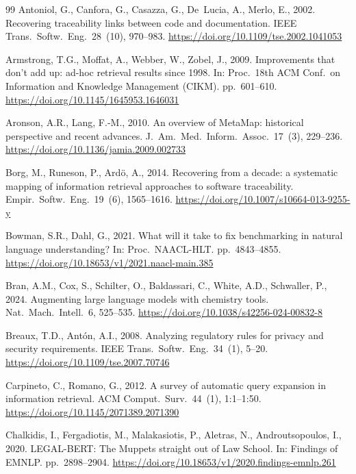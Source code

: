 \documentclass[a4paper,fleqn]{cas-sc}
\begin{document}
\begin{thebibliography}{99}
Antoniol, G., Canfora, G., Casazza, G., De~Lucia, A., Merlo, E., 2002. Recovering traceability links between code and documentation. IEEE Trans.\ Softw.\ Eng.\ 28~(10), 970--983. \url{https://doi.org/10.1109/tse.2002.1041053}

Armstrong, T.G., Moffat, A., Webber, W., Zobel, J., 2009. Improvements that don't add up: ad-hoc retrieval results since 1998. In: Proc.\ 18th ACM Conf.\ on Information and Knowledge Management (CIKM). pp.\ 601--610. \url{https://doi.org/10.1145/1645953.1646031}

Aronson, A.R., Lang, F.-M., 2010. An overview of MetaMap: historical perspective and recent advances. J.\ Am.\ Med.\ Inform.\ Assoc.\ 17~(3), 229--236. \url{https://doi.org/10.1136/jamia.2009.002733}

Borg, M., Runeson, P., Ard\"o, A., 2014. Recovering from a decade: a systematic mapping of information retrieval approaches to software traceability. Empir.\ Softw.\ Eng.\ 19~(6), 1565--1616. \url{https://doi.org/10.1007/s10664-013-9255-y}

Bowman, S.R., Dahl, G., 2021. What will it take to fix benchmarking in natural language understanding? In: Proc.\ NAACL-HLT. pp.\ 4843--4855. \url{https://doi.org/10.18653/v1/2021.naacl-main.385}

Bran, A.M., Cox, S., Schilter, O., Baldassari, C., White, A.D., Schwaller, P., 2024. Augmenting large language models with chemistry tools. Nat.\ Mach.\ Intell.\ 6, 525--535. \url{https://doi.org/10.1038/s42256-024-00832-8}

Breaux, T.D., Ant\'on, A.I., 2008. Analyzing regulatory rules for privacy and security requirements. IEEE Trans.\ Softw.\ Eng.\ 34~(1), 5--20. \url{https://doi.org/10.1109/tse.2007.70746}

Carpineto, C., Romano, G., 2012. A survey of automatic query expansion in information retrieval. ACM Comput.\ Surv.\ 44~(1), 1:1--1:50. \url{https://doi.org/10.1145/2071389.2071390}

Chalkidis, I., Fergadiotis, M., Malakasiotis, P., Aletras, N., Androutsopoulos, I., 2020. LEGAL-BERT: The Muppets straight out of Law School. In: Findings of EMNLP. pp.\ 2898--2904. \url{https://doi.org/10.18653/v1/2020.findings-emnlp.261}


\end{thebibliography}
\end{document}
